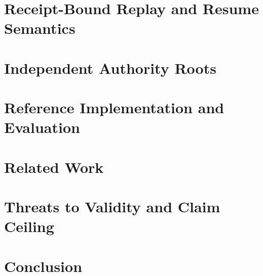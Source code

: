 \documentclass[11pt]{article}
\begin{document}


\section{Receipt-Bound Replay and Resume Semantics}



\section{Independent Authority Roots}



\section{Reference Implementation and Evaluation}



\section{Related Work}



\section{Threats to Validity and Claim Ceiling}



\section{Conclusion}





\end{document}

